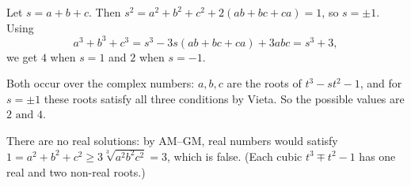 Let $s=a+b+c$. Then $s^2=a^2+b^2+c^2+2(ab+bc+ca)=1$, so $s=\pm1$. Using
\[a^3+b^3+c^3=s^3-3s(ab+bc+ca)+3abc=s^3+3,\]
we get $4$ when $s=1$ and $2$ when $s=-1$.

Both occur over the complex numbers: $a,b,c$ are the roots of $t^3-st^2-1$, and for $s=\pm1$ these roots satisfy all three conditions by Vieta. So the possible values are $\boxed{2\text{ and }4}$.

There are no real solutions: by AM--GM, real numbers would satisfy $1=a^2+b^2+c^2\ge3\sqrt[3]{a^2b^2c^2}=3$, which is false. (Each cubic $t^3\mp t^2-1$ has one real and two non-real roots.)
